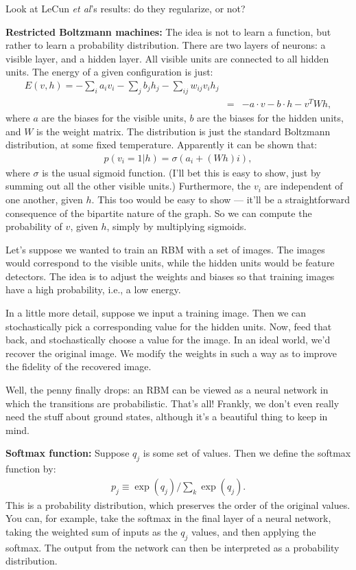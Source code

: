 \documentclass[12pt]{report}
\begin{document}
Look at LeCun \emph{et al}'s results: do they regularize, or not?

\textbf{Restricted Boltzmann machines:} The idea is not to learn a
function, but rather to learn a probability distribution.  There are
two layers of neurons: a visible layer, and a hidden layer.  All
visible units are connected to all hidden units.  The energy of a
given configuration is just:
\begin{eqnarray}
  E(v, h) = -\sum_i a_i v_i-\sum_j b_j h_j-\sum_{ij} w_{ij} v_i h_j \\
  & = & -a \cdot v-b\cdot h -v^T W h,
\end{eqnarray}
where $a$ are the biases for the visible units, $b$ are the biases for
the hidden units, and $W$ is the weight matrix.  The distribution is
just the standard Boltzmann distribution, at some fixed temperature.
Apparently it can be shown that:
\begin{eqnarray}
  p(v_i = 1 | h) = \sigma( a_i + (Wh)i),
\end{eqnarray}
where $\sigma$ is the usual sigmoid function.  (I'll bet this is easy
to show, just by summing out all the other visible units.)
Furthermore, the $v_i$ are independent of one another, given $h$.
This too would be easy to show --- it'll be a straightforward
consequence of the bipartite nature of the graph. So we can compute
the probability of $v$, given $h$, simply by multiplying sigmoids.

Let's suppose we wanted to train an RBM with a set of images.  The
images would correspond to the visible units, while the hidden units
would be feature detectors.  The idea is to adjust the weights and
biases so that training images have a high probability, i.e., a low
energy.  

In a little more detail, suppose we input a training image.  Then we
can stochastically pick a corresponding value for the hidden units.
Now, feed that back, and stochastically choose a value for the image.
In an ideal world, we'd recover the original image.  We modify the
weights in such a way as to improve the fidelity of the recovered
image.

Well, the penny finally drops: an RBM can be viewed as a neural
network in which the transitions are probabilistic.  That's all!
Frankly, we don't even really need the stuff about ground states,
although it's a beautiful thing to keep in mind.

\textbf{Softmax function:} Suppose $q_j$ is some set of values.  Then
  we define the softmax function by:
\begin{eqnarray}
p_j \equiv \exp(q_j)/\sum_k \exp(q_j).
\end{eqnarray}
This is a probability distribution, which preserves the order of the
original values.  You can, for example, take the softmax in the final
layer of a neural network, taking the weighted sum of inputs as the
$q_j$ values, and then applying the softmax.  The output from the
network can then be interpreted as a probability distribution.
\end{document}
